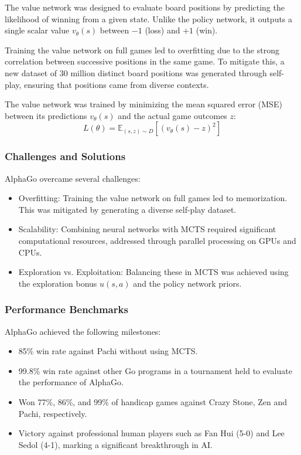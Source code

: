The value network was designed to evaluate board positions by predicting the
likelihood of winning from a given state. Unlike the policy network, it outputs
a single scalar value \( v_\theta(s) \) between \(-1\) (loss) and \(+1\) (win).

Training the value network on full games led to overfitting due to the strong
correlation between successive positions in the same game. To mitigate this, a
new dataset of 30 million distinct board positions was generated through
self-play, ensuring that positions came from diverse contexts.

The value network was trained by minimizing the mean squared error (MSE)
between its predictions \( v_\theta(s) \) and the actual game outcomes \( z \):
\begin{equation}
    L(\theta) = \mathbb{E}_{(s, z) \sim D} \left[ (v_\theta(s) - z)^2 \right]
\end{equation}
\subsubsection{Challenges and Solutions}
AlphaGo overcame several challenges:
\begin{itemize}
    \item Overfitting: Training the value network on full games led to memorization. This
          was mitigated by generating a diverse self-play dataset.
    \item Scalability: Combining neural networks with MCTS required significant
          computational resources, addressed through parallel processing on GPUs and
          CPUs.
    \item Exploration vs. Exploitation: Balancing these in MCTS was achieved using the
          exploration bonus \( u(s, a) \) and the policy network priors.
\end{itemize}

\subsubsection{Performance Benchmarks}
AlphaGo achieved the following milestones:
\begin{itemize}
    \item 85\% win rate against Pachi without using MCTS.
    \item 99.8\% win rate against other Go programs in a tournament held to evaluate the performance of AlphaGo.
    \item Won 77\%, 86\%, and 99\% of handicap games against Crazy Stone, Zen and Pachi,
          respectively.
    \item Victory against professional human players such as Fan Hui (5-0) and Lee Sedol
          (4-1), marking a significant breakthrough in AI.
\end{itemize}

